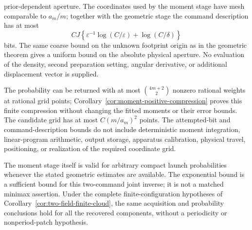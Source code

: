 \begin{theorem}
prior-dependent aperture.  The coordinates used by the moment stage
have mesh comparable to $a_m/m$; together with the geometric stage
the command description has at most
\begin{equation}\label{eq:two-field-joint-description}
 CJ\left\{\varepsilon^{-1}\log(C/\varepsilon)
                            +\log(C/\delta)\right\}
\end{equation}
bits.  The same coarse bound on the unknown footprint origin as in
the geometric theorem gives a uniform bound on the absolute physical
aperture.  No evaluation of the density, second preparation setting,
angular derivative, or additional displacement vector is supplied.

The probability can be returned with at most
$\binom{4m+2}{2}$ nonzero rational weights at rational grid points;
Corollary~\ref{cor:moment-positive-compression} proves this finite
compression without changing the fitted moments or their error bounds.
The candidate grid has at most $C(m/a_m)^2$ points. The attempted-bit
and command-description bounds do not include deterministic moment
integration, linear-program arithmetic, output storage, apparatus
calibration, physical travel, positioning, or realization of the
required coordinate grid.

The moment stage itself is valid for arbitrary compact launch
probabilities whenever the stated geometric estimates are available.
The exponential bound is a sufficient bound for this two-command
joint inverse; it is not a matched minimax assertion.  Under the
complete finite-configuration hypotheses of
Corollary~\ref{cor:two-field-finite-cloud}, the same acquisition and
probability conclusions hold for all the recovered components,
without a periodicity or nonperiod-patch hypothesis.
\end{theorem}
